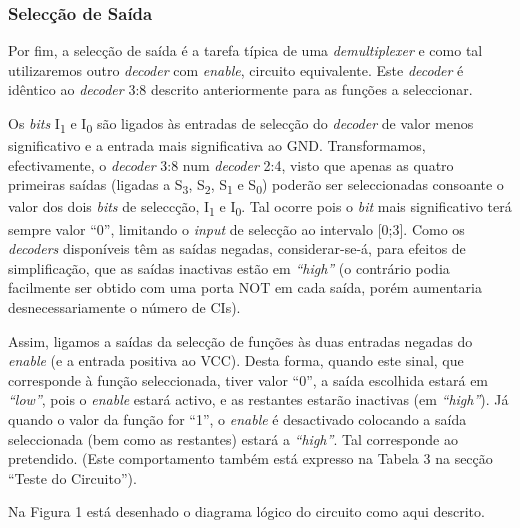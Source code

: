 \documentclass[a4paper,12pt]{article}
\begin{document}
\subsubsection{Selecção de Saída}
Por fim, a selecção de saída é a tarefa típica de uma {\it demultiplexer} 
e como tal utilizaremos outro {\it decoder} com {\it enable}, circuito 
equivalente. Este {\it decoder} é idêntico ao {\it decoder} 3:8 descrito 
anteriormente para as funções a seleccionar.
\par 
Os {\it bits} I\textsubscript{1} e I\textsubscript{0} são ligados às entradas 
de selecção do {\it decoder} de valor menos significativo e a entrada mais 
significativa ao GND. Transformamos, efectivamente, o {\it decoder} 3:8 num 
{\it decoder} 2:4, visto que apenas as quatro primeiras saídas (ligadas a 
S\textsubscript{3}, S\textsubscript{2}, S\textsubscript{1} e 
S\textsubscript{0}) poderão ser seleccionadas consoante o valor dos dois {\it 
bits} de seleccção, I\textsubscript{1} e I\textsubscript{0}. Tal ocorre pois 
o {\it bit} mais significativo terá sempre valor ``0'', limitando o {\it 
input} de selecção ao intervalo [0;3]. Como os {\it decoders} disponíveis 
têm as saídas negadas, considerar-se-á, para efeitos de simplificação, que 
as saídas inactivas estão em {\it ``high''} (o contrário podia facilmente 
ser obtido com uma porta NOT em cada saída, porém aumentaria 
desnecessariamente o número de CIs). 
\par
Assim, ligamos a saídas da selecção de funções às duas entradas negadas do {\it 
enable} (e a entrada positiva ao VCC). Desta forma, quando este sinal, que 
corresponde à função seleccionada, tiver valor ``0'', a saída escolhida 
estará em {\it ``low''}, pois o {\it enable} estará activo, e as restantes 
estarão inactivas (em {\it ``high''}). Já quando o valor da função for 
``1'', o {\it enable} é desactivado colocando a saída seleccionada (bem como 
as restantes) estará a {\it ``high''}. Tal corresponde ao pretendido. (Este 
comportamento também está expresso na Tabela 3 na secção ``Teste do 
Circuito'').
\par
Na Figura 1 está desenhado o diagrama lógico do circuito como aqui descrito.
\end{document}
